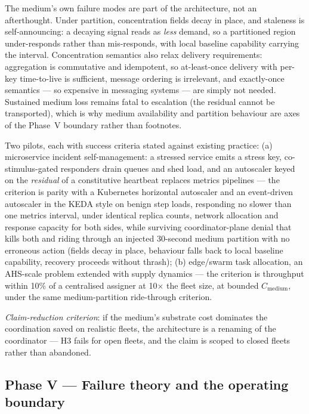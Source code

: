 \documentclass[twoside,twocolumn,usenatbib]{mnras}
\begin{document}
The medium's own failure modes are part of the architecture, not an
afterthought. Under partition, concentration fields decay in place,
and staleness is self-announcing: a decaying signal reads as
\emph{less} demand, so a partitioned region under-responds rather
than mis-responds, with local baseline capability carrying the
interval. Concentration semantics also relax delivery requirements:
aggregation is commutative and idempotent, so at-least-once delivery
with per-key time-to-live is sufficient, message ordering is
irrelevant, and exactly-once semantics --- so expensive in messaging
systems --- are simply not needed. Sustained medium loss remains
fatal to escalation (the residual cannot be transported), which is
why medium availability and partition behaviour are axes of the
Phase~V boundary rather than footnotes.

Two pilots, each
with success criteria stated against existing practice: (a)
microservice incident self-management: a stressed service emits a
stress key, co-stimulus-gated responders drain queues and shed load,
and an autoscaler keyed on the \emph{residual} of a constitutive
heartbeat replaces metrics pipelines --- the criterion is parity with
a Kubernetes horizontal autoscaler and an event-driven autoscaler in
the KEDA style on benign step loads, responding no
slower than one metrics interval, under identical replica counts,
network allocation and response capacity for both sides, while
surviving coordinator-plane denial that kills both and riding
through an injected 30-second medium partition with no erroneous
action (fields decay in place, behaviour falls back to local
baseline capability, recovery proceeds without thrash);
(b) edge/swarm task allocation, an AHS-scale problem
\citep{brinkschulte2008} extended with supply dynamics --- the
criterion is throughput within 10\% of a centralised assigner at
10$\times$ the fleet size, at bounded $C_{\mathrm{medium}}$, under
the same medium-partition ride-through criterion.

\emph{Claim-reduction criterion}: if the medium's substrate cost
dominates the
coordination saved on realistic fleets, the architecture is a renaming
of the coordinator --- H3 fails for open fleets, and the claim is
scoped to closed fleets rather than abandoned.

\subsection{Phase V --- Failure theory and the operating boundary}
\end{document}
